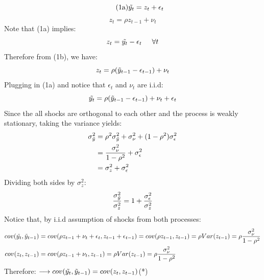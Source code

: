 \documentclass[12pt,a4paper]{article}
\begin{document}
\begin{equation}\tag{1a}
     \Tilde{y_t} = z_t+\epsilon_t
\end{equation}
\begin{equation}\tag{1b}
    z_t =\rho z_{t-1} +\nu_t
\end{equation}
Note that (1a) implies:
\begin{equation*}
    z_t=\Tilde{y_t}-\epsilon_t \hspace{5mm} \forall t
\end{equation*}
Therefore from (1b), we have:
\begin{equation*}
    z_{t}=\rho(\Tilde{y}_{t-1}-\epsilon_{t-1})+\nu_t
\end{equation*}
Plugging in (1a) and notice that $\epsilon_t$ and $\nu_t$ are i.i.d:
\begin{equation}\label{one}
    \Tilde{y_t}=\rho(\Tilde{y}_{t-1}-\epsilon_{t-1})+\nu_t+\epsilon_t
\end{equation}
Since the all shocks are orthogonal to each other and the process is weakly stationary, taking the variance yields:
\begin{align*}
    \sigma^2_{\Tilde{y}}&=\rho^2\sigma^2_{\Tilde{y}}+\sigma^2_{\nu}+(1-\rho^2)\sigma^2_{\epsilon}\\
    &=\frac{\sigma^2_\nu}{1-\rho^2} +\sigma^2_\epsilon\\
    &=\sigma^2_z+\sigma^2_\epsilon
\end{align*}
Dividing both sides by $\sigma^2_z$:
\begin{equation*}
    \frac{\sigma^2_{\Tilde{y}}}{\sigma^2_z}=1+\frac{\sigma^2_\epsilon}{\sigma^2_z}
\end{equation*}
Notice that, by i.i.d assumption of shocks from both processes:
\begin{align*}
    cov(\Tilde{y_t},\Tilde{y}_{t-1})&=cov(\rho z_{t-1} +\nu_t+\epsilon_t,z_{t-1}+ \epsilon_{t-1})=cov(\rho z_{t-1},z_{t-1})=\rho Var(z_{t-1})=\rho\frac{\sigma^2_{\nu}}{1-\rho^2}\\
    cov(z_t,z_{t-1})&=cov(\rho z_{t-1}+\nu_t,z_{t-1})=\rho Var(z_{t-1})=\rho\frac{\sigma^2_{\nu}}{1-\rho^2}
\end{align*}
Therefore: $ \longrightarrow cov(\Tilde{y_t},\Tilde{y}_{t-1})=cov(z_{t},z_{t-1}) $(*)\\

\end{document}
